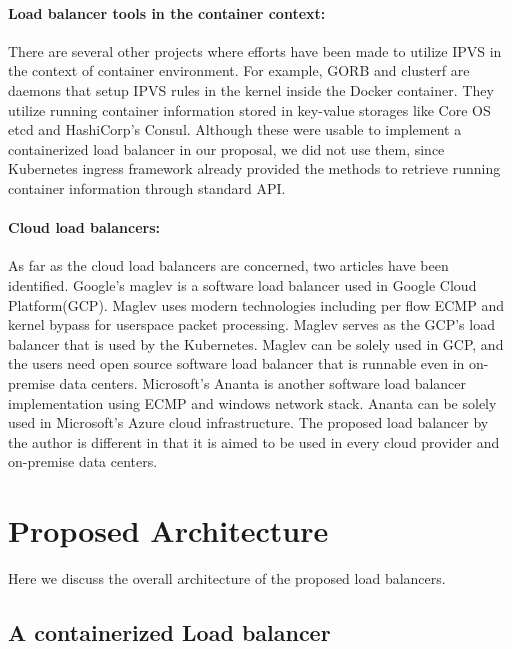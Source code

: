 \paragraph{\bf Load balancer tools in the container context:}
There are several other projects where efforts have been made to utilize IPVS in the context of container environment.
For example, GORB\cite{Sibiryov2015} and clusterf\cite{Aaltodoc:http://urn.fi/URN:NBN:fi:aalto-201611025433} are daemons 
that setup IPVS rules in the kernel inside the Docker container. 
They utilize running container information stored in key-value storages
like Core OS etcd\cite{CoreOSEtcd} and HashiCorp's Consul\cite{HashiCorpConsul}. 
Although these were usable to implement a containerized load balancer in our proposal, we did not use them, 
since Kubernetes ingress framework already provided the methods to retrieve running container information through standard API.

\paragraph{\bf Cloud load balancers:}

As far as the cloud load balancers are concerned, two articles have been identified.
Google's maglev\cite{eisenbud2016maglev} is a software load balancer used in Google Cloud Platform(GCP)\cite{Voellm2013}.
Maglev uses modern technologies including per flow ECMP and kernel bypass for userspace packet processing.
Maglev serves as the GCP's load balancer that is used by the Kubernetes.
Maglev can be solely used in GCP, and the users need open source software load balancer that is runnable even in on-premise data centers.
Microsoft's Ananta\cite{patel2013ananta} is another software load balancer implementation using ECMP and windows network stack.
Ananta can be solely used in Microsoft's Azure cloud infrastructure\cite{patel2013ananta}.
The proposed load balancer by the author is different in that it is aimed to be used in every cloud provider and on-premise data centers.

\section{Proposed Architecture}\label{Architecture}

Here we discuss the overall architecture of the proposed load balancers.

\subsection{A containerized Load balancer}

